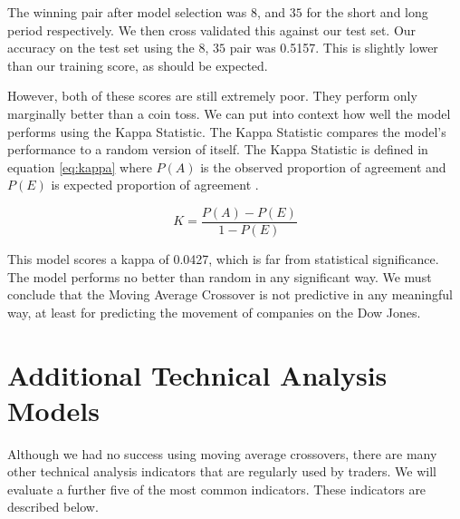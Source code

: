 \documentclass{report}
\begin{document}
The winning pair after model selection was $8$, and $35$ for the short and long period respectively. We then cross validated this against our test set. Our accuracy on the test set using the $8$, $35$ pair was 0.5157. This is slightly lower than our training score, as should be expected. 

However, both of these scores are still extremely poor. They perform only marginally better than a coin toss. We can put into context how well the model performs using the Kappa Statistic. The Kappa Statistic compares the model's performance to a random version of itself. The Kappa Statistic is defined in equation \ref{eq:kappa} where $P(A)$ is the observed proportion of agreement and $P(E)$ is expected proportion of agreement \cite{cunningham2009more}.

  \begin{figure}[H]
  \begin{center}
      \begin{equation}
        K = \dfrac{P(A) - P(E)} {1 - P(E)}
        \label{eq:kappa}
      \end{equation}
  \end{center}
  \end{figure} 

This model scores a kappa of 0.0427, which is far from statistical significance. The model performs no better than random in any significant way. We must conclude that the Moving Average Crossover is not predictive in any meaningful way, at least for predicting the movement of companies on the Dow Jones.

\section{Additional Technical Analysis Models}

Although we had no success using moving average crossovers, there are many other technical analysis indicators that are regularly used by traders. We will evaluate a further five of the most common indicators. These indicators are described below.
\end{document}
